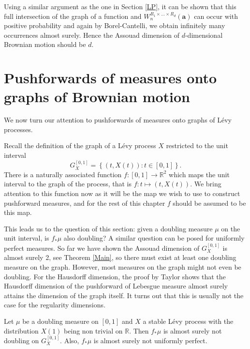 Using a similar argument as the one in Section \ref{LP}, it can be shown that this full intersection of the graph of a function and $W_{n}^{R_1\times\dots\times R_d}(\mathbf{a})$ can occur with positive probability and again by Borel-Cantelli, we obtain infinitely many occurrences almost surely. Hence the Assouad dimension of $d$-dimensional Brownian motion should be $d$. 















\section{Pushforwards of measures onto graphs of Brownian motion}


We now turn our attention to pushforwards of measures onto graphs of L\'evy processes.


Recall the definition of the graph of a L\'evy process $X$ restricted to the unit interval
\[
G_X^{[0,1]} = \left\{ (t,X(t)) \colon t \in [0,1] \right\}.
\]
There is a naturally associated function $f: [0,1] \rightarrow \mathbb{R}^2$ which maps the unit interval to the graph of the process, that is $f\colon t \mapsto (t,X(t))$. We bring attention to this function now as it will be the map we wish to use to construct pushforward measures, and for the rest of this chapter $f$ should be assumed to be this map. 





This leads us to the question of this section: given a doubling measure $\mu$ on the unit interval, is $f_*\mu$ also doubling? A similar question can be posed for uniformly perfect measures. So far we have shown the Assouad dimension of $G_X^{[0,1]}$ is almost surely 2, see Theorem \ref{Main}, so there must exist at least one doubling measure on the graph. However, most measures on the graph might not even be doubling. For the Hausdorff dimension, the proof by Taylor shows that the Hausdorff dimension of the pushforward of Lebesgue measure almost surely attains the dimension of the graph itself. It turns out that this is usually not the case for the regularity dimensions.

\begin{theorem}\label{brownianthm}
	Let $\mu$ be a doubling measure on $[0,1]$ and $X$ a stable L\'evy process with the distribution $X(1)$ being non trivial on $\mathbb{R}$. Then $f_*\mu$ is almost surely not doubling on $G_X^{[0,1]}$. Also, $f_*\mu$ is almost surely not uniformly perfect.
\end{theorem}


